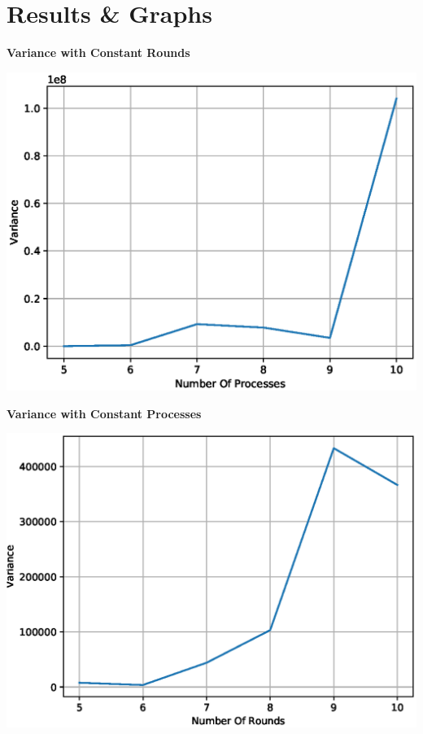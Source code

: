 \documentclass[a4paper,12pt]{report}
\begin{document}
\section{Results \& Graphs}
\begin{center}
\begin{large}
\textbf{Variance with Constant Rounds}\\
\end{large}
\includegraphics[scale=0.7]{./constantK.eps}
\end{center}
\begin{center}
\begin{large}
\textbf{Variance with Constant Processes}\\
\end{large}
\includegraphics[scale=0.7]{./constantN.eps}
\end{center}
\end{document}
